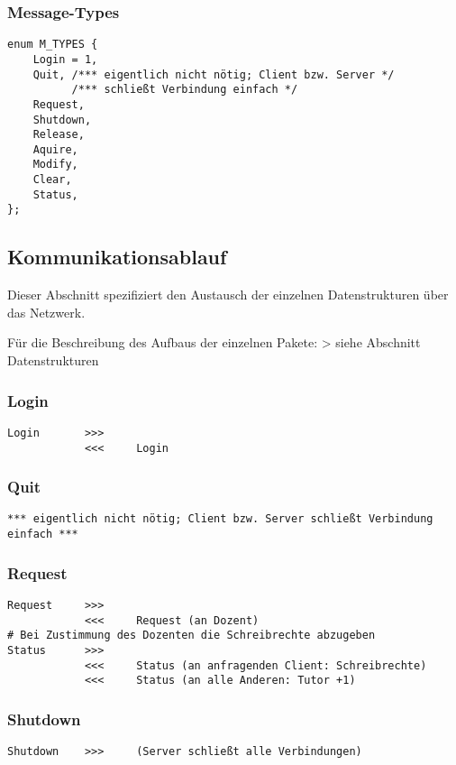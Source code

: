 \subsubsection{Message-Types}
\begin{lstlisting}
enum M_TYPES {
    Login = 1,
    Quit, /*** eigentlich nicht nötig; Client bzw. Server */
          /*** schließt Verbindung einfach */
    Request,
    Shutdown,
    Release,
    Aquire,
    Modify,
    Clear,
    Status,
};
\end{lstlisting}

\subsection{Kommunikationsablauf}
Dieser Abschnitt spezifiziert den Austausch der einzelnen Datenstrukturen
über das Netzwerk.

Für die Beschreibung des Aufbaus der einzelnen Pakete: 
> siehe Abschnitt Datenstrukturen

\subsubsection{Login}
\begin{lstlisting}
Login       >>>
            <<<     Login
\end{lstlisting}

\subsubsection{Quit}
\begin{lstlisting}
*** eigentlich nicht nötig; Client bzw. Server schließt Verbindung einfach ***
\end{lstlisting}

\subsubsection{Request}
\begin{lstlisting}
Request     >>>
            <<<     Request (an Dozent)
# Bei Zustimmung des Dozenten die Schreibrechte abzugeben
Status      >>>
            <<<     Status (an anfragenden Client: Schreibrechte)
            <<<     Status (an alle Anderen: Tutor +1)
\end{lstlisting}

\subsubsection{Shutdown}
\begin{lstlisting}
Shutdown    >>>     (Server schließt alle Verbindungen)
\end{lstlisting}

